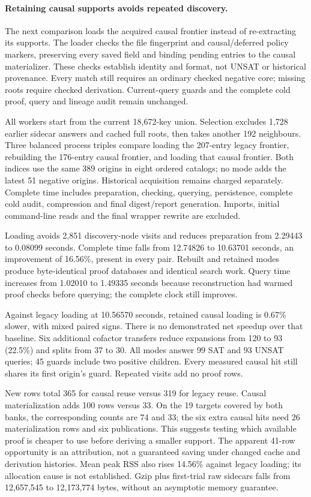 \documentclass[11pt,a4paper]{article}
\numberwithin{equation}{section}
\theoremstyle{plain}
\theoremstyle{definition}
\theoremstyle{remark}
\begin{document}
\paragraph{Retaining causal supports avoids repeated discovery.}
The next comparison loads the acquired causal frontier instead of re-extracting
its supports. The loader checks the file fingerprint and causal/deferred policy
markers, preserving every saved field and binding pending entries to the causal
materializer. These checks establish identity and format, not UNSAT or historical
provenance. Every match still requires an ordinary checked negative core; missing
roots require checked derivation. Current-query guards and the complete cold
proof, query and lineage audit remain unchanged.

All workers start from the current 18,672-key union. Selection excludes 1,728
earlier sidecar answers and cached full roots, then takes another 192 neighbours.
Three balanced process triples compare loading the 207-entry legacy frontier,
rebuilding the 176-entry causal frontier, and loading that causal frontier.
Both indices use the same 389 origins in eight ordered catalogs; no mode adds
the latest 51 negative origins. Historical acquisition remains charged separately.
Complete time includes preparation, checking, querying, persistence, complete
cold audit, compression and final digest/report generation. Imports, initial
command-line reads and the final wrapper rewrite are excluded.

Loading avoids 2,851 discovery-node visits and reduces preparation from 2.29443
to 0.08099 seconds. Complete time falls from 12.74826 to 10.63701 seconds,
an improvement of 16.56\%, present in every pair. Rebuilt and retained modes
produce byte-identical proof databases and identical search work. Query time
increases from 1.02010 to 1.49335 seconds because reconstruction had warmed
proof checks before querying; the complete clock still improves.

Against legacy loading at 10.56570 seconds, retained causal loading is 0.67\%
slower, with mixed paired signs. There is no demonstrated net speedup over
that baseline. Six additional cofactor transfers reduce expansions from 120
to 93 (22.5\%) and splits from 37 to 30. All modes answer 99 SAT and 93 UNSAT
queries; 45 guards include two positive children. Every measured causal hit
still shares its first origin's guard. Repeated visits add no proof rows.

New rows total 365 for causal reuse versus 319 for legacy reuse. Causal
materialization adds 100 rows versus 33. On the 19 targets covered by both banks,
the corresponding counts are 74 and 33; the six extra causal hits need 26
materialization rows and six publications. This suggests testing which available
proof is cheaper to use before deriving a smaller support. The apparent 41-row
opportunity is an attribution, not a guaranteed saving under changed cache and
derivation histories. Mean peak RSS also rises 14.56\% against legacy loading;
its allocation cause is not established. Gzip plus first-trial raw sidecars falls
from 12,657,545 to 12,173,774 bytes, without an asymptotic memory guarantee.
\end{document}
